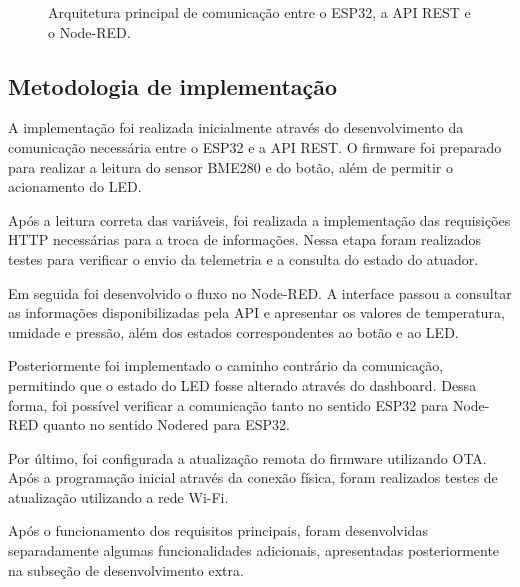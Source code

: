 \begin{figure}[H]
{%
	}
	\caption{Arquitetura principal de comunicação entre o ESP32, a API REST e o Node-RED.}
	\label{fig:arquitetura_principal}
\end{figure}

\subsection{Metodologia de implementação}

A implementação foi realizada inicialmente através do desenvolvimento da comunicação necessária entre o ESP32 e a API REST. O firmware foi preparado para realizar a leitura do sensor BME280 e do botão, além de permitir o acionamento do LED.

Após a leitura correta das variáveis, foi realizada a implementação das requisições HTTP necessárias para a troca de informações. Nessa etapa foram realizados testes para verificar o envio da telemetria e a consulta do estado do atuador.

Em seguida foi desenvolvido o fluxo no Node-RED. A interface passou a consultar as informações disponibilizadas pela API e apresentar os valores de temperatura, umidade e pressão, além dos estados correspondentes ao botão e ao LED.

Posteriormente foi implementado o caminho contrário da comunicação, permitindo que o estado do LED fosse alterado através do dashboard. Dessa forma, foi possível verificar a comunicação tanto no sentido ESP32 para Node-RED quanto no sentido Nodered para ESP32.

Por último, foi configurada a atualização remota do firmware utilizando OTA. Após a programação inicial através da conexão física, foram realizados testes de atualização utilizando a rede Wi-Fi.

Após o funcionamento dos requisitos principais, foram desenvolvidas separadamente algumas funcionalidades adicionais, apresentadas posteriormente na subseção de desenvolvimento extra.


